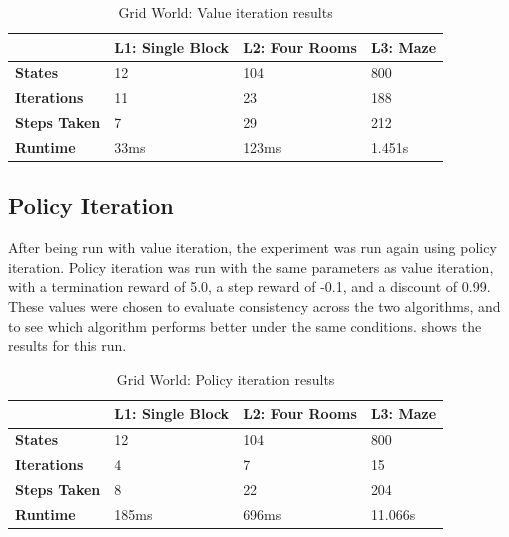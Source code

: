 \documentclass{article}
\begin{document}
      \begin{table}[h]
      \centering
        \begin{tabular}{|l|l|l|l|} \hline
          & \textbf{L1: Single Block} & \textbf{L2: Four Rooms} & \textbf{L3: Maze} \\ \hline
          \textbf{States} & 12 & 104 & 800 \\ \hline
          \textbf{Iterations} & 11 & 23 & 188 \\ \hline
          \textbf{Steps Taken} & 7 & 29 & 212 \\ \hline
          \textbf{Runtime} & 33ms & 123ms & 1.451s \\ \hline
        \end{tabular}

      \caption{Grid World: Value iteration results}
      \label{tab:gw-vi-results}
      \end{table}

    \subsection{Policy Iteration}
      After being run with value iteration, the experiment was run again using policy iteration. Policy iteration was run with the same parameters as value iteration, with a termination reward of 5.0, a step reward of -0.1, and a discount of 0.99. These values were chosen to evaluate consistency across the two algorithms, and to see which algorithm performs better under the same conditions.  shows the results for this run.

      \begin{table}[h]
      \centering

        \begin{tabular}{|l|l|l|l|} \hline
          & \textbf{L1: Single Block} & \textbf{L2: Four Rooms} & \textbf{L3: Maze} \\ \hline
          \textbf{States} & 12 & 104 & 800 \\ \hline
          \textbf{Iterations} & 4 & 7 & 15 \\ \hline
          \textbf{Steps Taken} & 8 & 22 & 204 \\ \hline
          \textbf{Runtime} & 185ms & 696ms & 11.066s \\ \hline
        \end{tabular}

      \caption{Grid World: Policy iteration results}
      \label{tab:gw-pi-results}
      \end{table}
\end{document}
